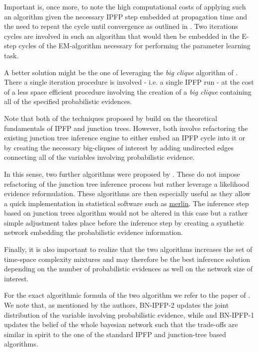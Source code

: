 \documentclass[11pt]{article}
\begin{document}
\begin{article}
Important is, once more, to note the high computational
costs of applying such an algorithm given the necessary IPFP step
embedded at propagation time and the need to repeat the cycle until
convergence as outlined in \cite{Valtorta_2002}. Two iterations cycles are
involved in such an algorithm that would then be embedded in the E-step
cycles of the EM-algorithm necessary for performing the parameter learning task. 

A better solution might be the one of leveraging the \emph{big clique}
algorithm of \cite{Valtorta_2002}. There a single iteration procedure
is involved - i.e. a single IPFP run - at the cost of a less space
efficient procedure involving the creation of a \emph{big clique}
containing all of the specified probabilistic evidences.

Note that both of the techniques proposed by \cite{Valtorta_2002}
build on the theoretical fundamentals of IPFP and junction
trees. However, both involve refactoring the existing junction tree
inference engine to either embed an IPFP cycle into it or by
creating the necessary big-cliques of interest by adding undirected
edges connecting all of the variables involving probabilistic
evidence.

In this sense, two further algorithms were proposed by
\cite{PENG_2010}. These do not impose refactoring of the junction tree
inference process but rather leverage a likelihood evidence
reformulation. These algorithms are then especially useful as they
allow a quick implementation in statistical software such as
\href{https://github.com/radum2275/merlin}{merlin}. The inference step based on junction trees algorithm would
not be altered in this case but a rather simple adjustment takes
place before the inference step by creating a synthetic network
embedding the probabilistic evidence information.

Finally, it is also important to realize that the two algorithms
increases the set of time-space complexity mixtures and may
therefore be the best inference solution depending on the number of
probabilistic evidences as well on the network size of interest.

For the exact algorithmic formula of the two algorithm we refer to
the paper of \cite{PENG_2010}. We note that, as mentioned by the
authors, BN-IPFP-2 updates the joint distribution of the variable
involving probabilistic evidence, while and BN-IPFP-1 updates the
belief of the whole bayesian network such that the trade-offs are
similar in spirit to the one of the standard IPFP and junction-tree
based algorithms.


\end{article}
\end{document}
